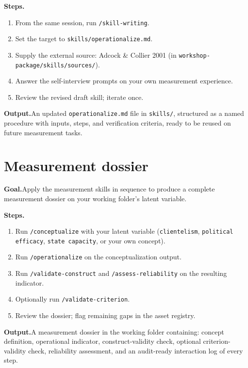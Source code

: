 \documentclass[10pt,a4paper]{article}
\begin{document}
\smallskip
\textbf{Steps.}
\begin{enumerate}
  \item From the same session, run \texttt{/skill-writing}.
  \item Set the target to \texttt{skills/operationalize.md}.
  \item Supply the external source: Adcock \& Collier 2001 (in \texttt{workshop-package/skills/sources/}).
  \item Answer the self-interview prompts on your own measurement experience.
  \item Review the revised draft skill; iterate once.
\end{enumerate}

\smallskip
\textbf{Output.}\quad An updated \texttt{operationalize.md} file in \texttt{skills/}, structured as a named procedure with inputs, steps, and verification criteria, ready to be reused on future measurement tasks.

\section{Measurement dossier}
\textbf{Goal.}\quad Apply the measurement skills in sequence to produce a complete measurement dossier on your working folder's latent variable.

\smallskip
\textbf{Steps.}
\begin{enumerate}
  \item Run \texttt{/conceptualize} with your latent variable (\texttt{clientelism}, \texttt{political efficacy}, \texttt{state capacity}, or your own concept).
  \item Run \texttt{/operationalize} on the conceptualization output.
  \item Run \texttt{/validate-construct} and \texttt{/assess-reliability} on the resulting indicator.
  \item Optionally run \texttt{/validate-criterion}.
  \item Review the dossier; flag remaining gaps in the asset registry.
\end{enumerate}

\smallskip
\textbf{Output.}\quad A measurement dossier in the working folder containing: concept definition, operational indicator, construct-validity check, optional criterion-validity check, reliability assessment, and an audit-ready interaction log of every step.
\end{document}
